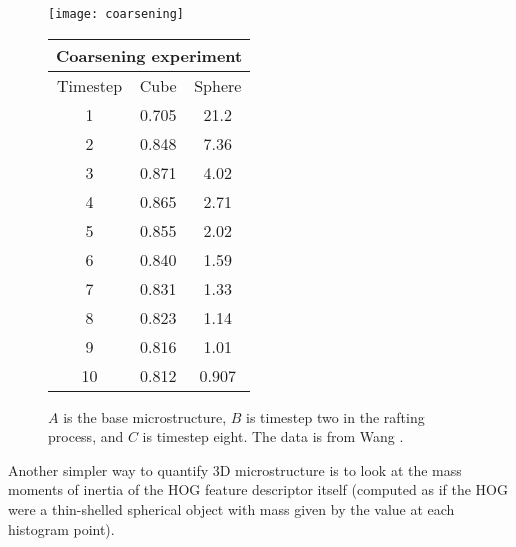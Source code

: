 \documentclass[review]{elsarticle}
\begin{document}
	\begin{figure}[!ht]
    	\begin{center}
			\texttt{[image: coarsening]}
	  		\caption{ $A$ is the base microstructure, $B$ is timestep two in the rafting process, and $C$ is timestep eight. The data is from Wang \cite{ywang2}. }
	  		\label{figure8}
  		
			\begin{tabular}{ c | c | c }
				\multicolumn{3}{c}{Coarsening experiment} \\
				\hline
				Timestep & Cube & Sphere \\
				\hline
				1 & 0.705 & 21.2 \\
				2 & 0.848 & 7.36 \\
				3 & 0.871 & 4.02 \\
				4 & 0.865 & 2.71 \\
				5 & 0.855 & 2.02 \\
				6 & 0.840 & 1.59 \\
				7 & 0.831 & 1.33 \\
				8 & 0.823 & 1.14 \\
				9 & 0.816 & 1.01 \\
				10 & 0.812 & 0.907 \\
				\hline
			\end{tabular}
			\label{table3}
		\end{center}
	\end{figure}
	
	Another simpler way to quantify 3D microstructure is to look at the mass moments of inertia of the HOG feature descriptor itself (computed as if the HOG were a thin-shelled spherical object with mass given by the value at each histogram point).
	
\end{document}
